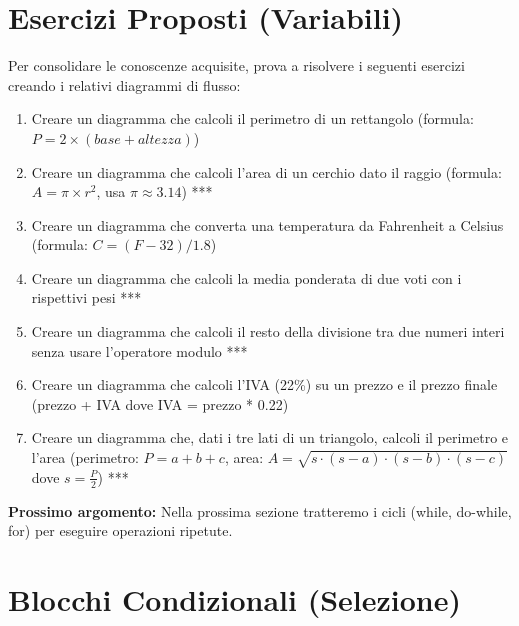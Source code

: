 \documentclass[a4paper,16pt]{article}
\begin{document}
\section{Esercizi Proposti (Variabili)}

Per consolidare le conoscenze acquisite, prova a risolvere i seguenti esercizi creando i relativi diagrammi di flusso:

\begin{enumerate}[leftmargin=*]
    \item Creare un diagramma che calcoli il perimetro di un rettangolo (formula: $P = 2 \times (base + altezza)$)
    
    \item Creare un diagramma che calcoli l'area di un cerchio dato il raggio (formula: $A = \pi \times r^2$, usa $\pi \approx 3.14$) ***
    
    \item Creare un diagramma che converta una temperatura da Fahrenheit a Celsius (formula: $C = (F - 32) / 1.8$)
    
    \item Creare un diagramma che calcoli la media ponderata di due voti con i rispettivi pesi ***
    
    \item Creare un diagramma che calcoli il resto della divisione tra due numeri interi senza usare l'operatore modulo ***
    
    \item Creare un diagramma che calcoli l'IVA (22\%) su un prezzo e il prezzo finale (prezzo + IVA dove IVA = prezzo * 0.22)

    \item Creare un diagramma che, dati i tre lati di un triangolo, calcoli il perimetro e l'area (perimetro: $P = a + b + c$, area: $A = \sqrt{s \cdot (s - a) \cdot (s - b) \cdot (s - c)}$ dove $s = \frac{P}{2}$) ***
\end{enumerate}

\vspace{1cm}
\begin{tcolorbox}[colback=yellow!10!white,colframe=orange!75!black,title=Nota]
\textbf{Prossimo argomento:} Nella prossima sezione tratteremo i cicli (while, do-while, for) per eseguire operazioni ripetute.
\end{tcolorbox}

\newpage

\section{Blocchi Condizionali (Selezione)}
\end{document}
